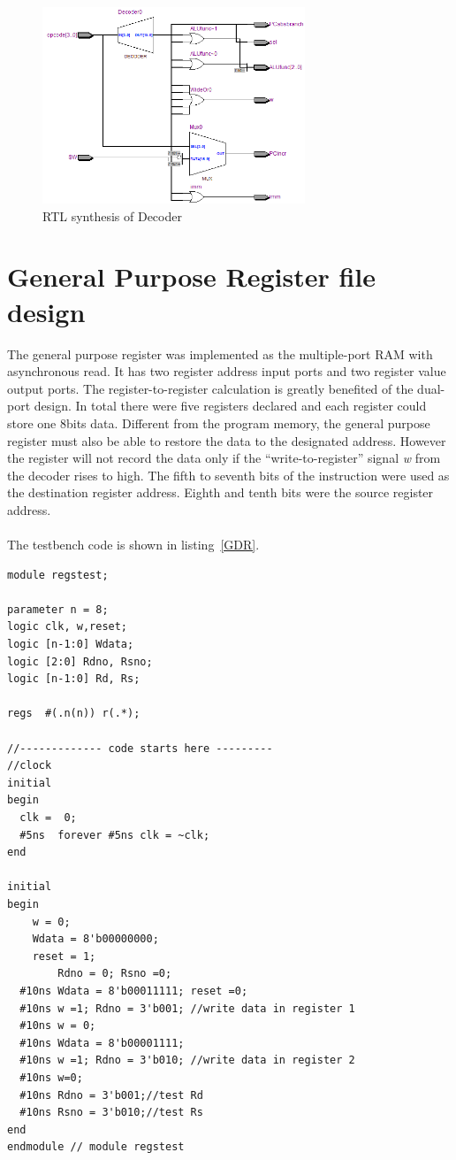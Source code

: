 \begin{figure}[H]
		\centering
		\includegraphics[width = 0.7\textwidth]{Figures/decoder}		
		\caption{RTL synthesis of Decoder}
		\label {fig:decoder}
\end{figure}

\section{General Purpose Register file design} \label{General Purpose Register}

The general purpose register was implemented as the multiple-port RAM with asynchronous read. It has two register address input ports and two register value output ports. The register-to-register calculation is greatly benefited of the dual-port design. In total there were five registers declared and each register could store one 8bits data. Different from the program memory, the general purpose register must also be able to restore the data to the designated address. However the register will not record the data only if the “write-to-register” signal \textit{w} from the decoder rises to high. The fifth to seventh bits of the instruction were used as the destination register address. Eighth and tenth bits were the source register address.\\\\
The testbench code is shown in listing~\ref{GDR}.
\begin{lstlisting}
module regstest;

parameter n = 8;
logic clk, w,reset;
logic [n-1:0] Wdata;
logic [2:0] Rdno, Rsno;
logic [n-1:0] Rd, Rs;

regs  #(.n(n)) r(.*);

//------------- code starts here ---------
//clock
initial
begin
  clk =  0;
  #5ns  forever #5ns clk = ~clk;
end

initial
begin
    w = 0;
    Wdata = 8'b00000000;
    reset = 1;
		Rdno = 0; Rsno =0;
  #10ns Wdata = 8'b00011111; reset =0;
  #10ns w =1; Rdno = 3'b001; //write data in register 1
  #10ns w = 0;
  #10ns Wdata = 8'b00001111;
  #10ns w =1; Rdno = 3'b010; //write data in register 2
  #10ns w=0;
  #10ns Rdno = 3'b001;//test Rd
  #10ns Rsno = 3'b010;//test Rs
end
endmodule // module regstest
\end{lstlisting}

